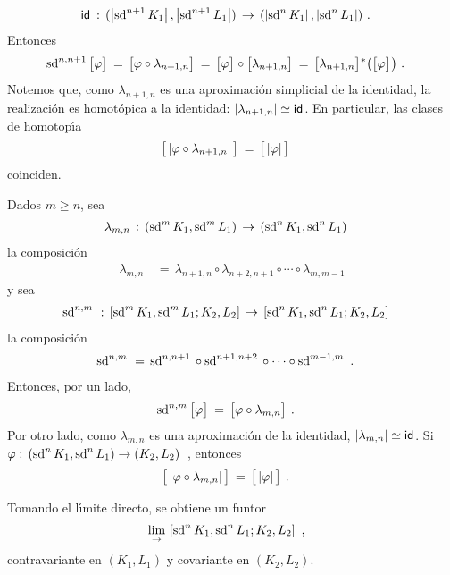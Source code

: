 \begin{obsLimiteDirectoDeSubdivisiones}
\begin{align*}
		\id & \,:\,
			(\geom{\subdiv[n+1]{K_{1}}},\geom{\subdiv[n+1]{L_{1}}})
			\,\rightarrow\,
			(\geom{\subdiv[n]{K_{1}}},\geom{\subdiv[n]{L_{1}}})
		\text{ .}
	\end{align*}
	Entonces
	\begin{align*}
		\subdiv[n,n+1]{\clase{\varphi}} & \,=\,
			\clase{\varphi\circ\lambda_{n+1,n}}\,=\,
			\clase{\varphi}\circ\clase{\lambda_{n+1,n}} \,=\,
			\clase{\lambda_{n+1,n}}^{*}\big(\clase{\varphi}\big)
		\text{ .}
	\end{align*}
	Notemos que, como $\lambda_{n+1,n}$ es una aproximaci\'{o}n
	simplicial de la identidad, la realizaci\'{o}n es homot\'{o}pica a
	la identidad: $\geom{\lambda_{n+1,n}}\simeq\id$. En particular, las
	clases de homotop\'{\i}a
	\begin{align*}
		\clase{\geom{\varphi\circ\lambda_{n+1,n}}} & \,=\,
			\clase{\geom{\varphi}}
	\end{align*}
	coinciden.

	Dados $m\geq n$, sea
	\begin{align*}
		\lambda_{m,n} & \,:\,(\subdiv[m]{K_{1}},\subdiv[m]{L_{1}})
			\,\rightarrow\,(\subdiv[n]{K_{1}},\subdiv[n]{L_{1}})
	\end{align*}
	la composici\'{o}n
	\begin{align*}
		\lambda_{m,n} & \,=\,\lambda_{n+1,n}\circ\lambda_{n+2,n+1}
			\circ\cdots\circ\lambda_{m,m-1}
	\end{align*}
	y sea
	\begin{align*}
		\subdiv[n,m]{\null} & \,:\,
			\contiguas{\subdiv[m]{K_{1}},\subdiv[m]{L_{1}}}%
				{K_{2},L_{2}} \,\rightarrow\,
			\contiguas{\subdiv[n]{K_{1}},\subdiv[n]{L_{1}}}%
				{K_{2},L_{2}}
	\end{align*}
	la composici\'{o}n
	\begin{align*}
		\subdiv[n,m]{\null} & \,=\,\subdiv[n,n+1]{\null}\circ
			\subdiv[n+1,n+2]{\null}\circ\cdots\circ
			\subdiv[m-1,m]{\null}
		\text{ .}
	\end{align*}
	Entonces, por un lado,
	\begin{align*}
		\subdiv[n,m]{\clase{\varphi}} & \,=\,
			\clase{\varphi\circ\lambda_{m,n}}
		\text{ .}
	\end{align*}
	Por otro lado, como $\lambda_{m,n}$ es una aproximaci\'{o}n de la
	identidad, $\geom{\lambda_{m,n}}\simeq\id$. Si
	\begin{math}
		\varphi:\,(\subdiv[n]{K_{1}},\subdiv[n]{L_{1}})\rightarrow
			(K_{2},L_{2})
	\end{math}~,
	entonces
	\begin{align*}
		\clase{\geom{\varphi\circ\lambda_{m,n}}} & \,=\,
			\clase{\geom{\varphi}}
		\text{ .}
	\end{align*}
	
	Tomando el l\'{\i}mite directo, se obtiene un funtor
	\begin{align*}
		& \lim_{\to}\,\contiguas{\subdiv[n]{K_{1}},\subdiv[n]{L_{1}}}%
				{K_{2},L_{2}}
		\text{ ,}
	\end{align*}
	contravariante en $(K_{1},L_{1})$ y covariante en $(K_{2},L_{2})$.
\end{obsLimiteDirectoDeSubdivisiones}

